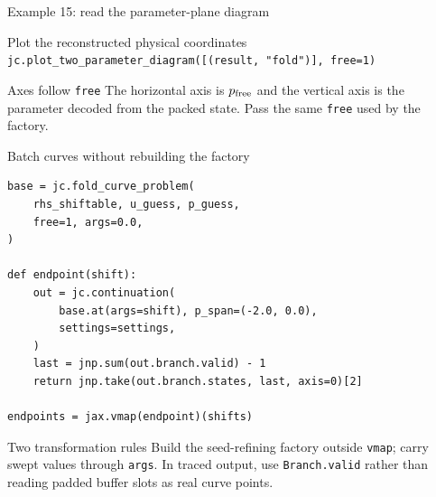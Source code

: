 \begin{frame}{Example 15: read the parameter-plane diagram}
\centering
\small
{}
\vspace{1mm}
\begin{block}{Plot the reconstructed physical coordinates}
\centering
\texttt{jc.plot\_two\_parameter\_diagram([(result, "fold")], free=1)}
\end{block}
\begin{alertblock}{Axes follow \texttt{free}}
The horizontal axis is $p_{\rm free}$ and the vertical axis is the parameter
decoded from the packed state. Pass the same \texttt{free} used by the factory.
\end{alertblock}
\end{frame}

\begin{frame}[fragile]{Batch curves without rebuilding the factory}
\small
\begin{lstlisting}
base = jc.fold_curve_problem(
    rhs_shiftable, u_guess, p_guess,
    free=1, args=0.0,
)

def endpoint(shift):
    out = jc.continuation(
        base.at(args=shift), p_span=(-2.0, 0.0),
        settings=settings,
    )
    last = jnp.sum(out.branch.valid) - 1
    return jnp.take(out.branch.states, last, axis=0)[2]

endpoints = jax.vmap(endpoint)(shifts)
\end{lstlisting}
\begin{alertblock}{Two transformation rules}
Build the seed-refining factory outside \texttt{vmap}; carry swept values
through \texttt{args}. In traced output, use \texttt{Branch.valid} rather than
reading padded buffer slots as real curve points.
\end{alertblock}
\end{frame}

